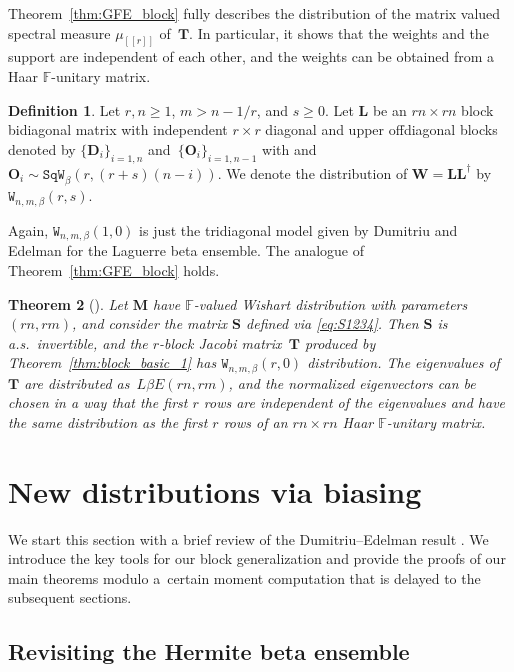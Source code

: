 \documentclass[pdftex]{sigma}
\numberwithin{equation}{section}
\newtheorem{Theorem}{Theorem}[section]
\theoremstyle{definition}
\newtheorem{Definition}[Theorem]{Definition}
\newcommand{\FF}{{\mathbb{F}}}
\newcommand{\T}{\dag}
\newcommand{\lst}[1]{[\![#1 ]\!]}
\newcommand{\mbf}[1]{\mathbf{#1}}
\newcommand{\WW}{\mathtt{W}_{n,m, \beta}}
\newcommand{\SQW}{\mathtt{SqW}_\beta}
\begin{document}
Theorem~\ref{thm:GFE_block} fully describes the distribution of the matrix valued spectral measure $\mu_{\lst{r}}$ of~$\mbf{T}$. In particular, it shows that the weights and the support are independent of each other, and the weights can be obtained from a Haar $\FF$-unitary matrix.


\begin{Definition}\label{def:BlockW}
Let $r,n\ge 1$, $m>n-1/r$, and $s\ge 0$.
Let $\mathbf{L}$
be an $rn \times rn$ block bidiagonal matrix with independent $r\times r$ diagonal and upper offdiagonal blocks denoted by
$\{\mbf{D}_i\}_{i=1,n}$ and~${\{\mbf{O}_i\}_{i=1, n-1}}$ with \smash{$\mbf{D}_i^{\T}\sim \SQW(r,(r+s)(m+1-i))$} and $\mbf{O}_i\sim \SQW(r,(r+s)(n-i))$. We denote the distribution of $\mbf{W}=\mbf{L}\mbf{L}^{\T}$ by $\WW(r,s)$.
\end{Definition}
Again, $\WW(1,0)$ is just the tridiagonal model given by Dumitriu and Edelman for the Laguerre beta ensemble.
The analogue of Theorem~\ref{thm:GFE_block} holds.
\begin{Theorem}[\cite{Spike2}]\label{thm:W_block}
 Let $\mbf{M}$ have $\FF$-valued Wishart distribution with parameters $(rn,rm)$, and consider the matrix $\mbf{S}$ defined via \eqref{eq:S1234}. Then $\mbf{S}$ is a.s.~invertible, and the $r$-block Jacobi matrix~$\mbf{T}$ produced by Theorem~{\rm\ref{thm:block_basic_1}} has $\WW(r,0)$ distribution.
 The eigenvalues of $\mbf{T}$ are distributed as~$L\beta E(rn,rm)$, and the normalized eigenvectors can be chosen in a way that the first $r$ rows are independent of the eigenvalues and have the same distribution as the first $r$ rows of an $rn\times rn$ Haar $\FF$-unitary matrix.
\end{Theorem}




\section{New distributions via biasing}\label{sec3}

We start this section with a brief review of the Dumitriu--Edelman result \cite{DE}. We introduce the key tools for our block generalization and provide the proofs of our main theorems modulo a~certain moment computation that is delayed to the subsequent sections.




\subsection{Revisiting the Hermite beta ensemble}
\end{document}
